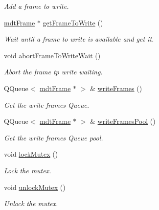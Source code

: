 \begin{DoxyCompactItemize}
\begin{DoxyCompactList}\small\item\em Add a frame to write. \end{DoxyCompactList}\item 
\hyperlink{classmdt_frame}{mdt\-Frame} $\ast$ \hyperlink{classmdt_abstract_port_a6c5ebd4451aec959efc4e71ab1b13941}{get\-Frame\-To\-Write} ()
\begin{DoxyCompactList}\small\item\em Wait until a frame to write is available and get it. \end{DoxyCompactList}\item 
void \hyperlink{classmdt_abstract_port_ae67c815f68317c70e398eaa86622af6b}{abort\-Frame\-To\-Write\-Wait} ()
\begin{DoxyCompactList}\small\item\em Abort the frame tp write waiting. \end{DoxyCompactList}\item 
Q\-Queue$<$ \hyperlink{classmdt_frame}{mdt\-Frame} $\ast$ $>$ \& \hyperlink{classmdt_abstract_port_a4fed10be147dfce6ca315467ff3fb968}{write\-Frames} ()
\begin{DoxyCompactList}\small\item\em Get the write frames Queue. \end{DoxyCompactList}\item 
Q\-Queue$<$ \hyperlink{classmdt_frame}{mdt\-Frame} $\ast$ $>$ \& \hyperlink{classmdt_abstract_port_abf093b67fddebffa4f3c52277b9a8cf7}{write\-Frames\-Pool} ()
\begin{DoxyCompactList}\small\item\em Get the write frames Queue pool. \end{DoxyCompactList}\item 
void \hyperlink{classmdt_abstract_port_a6bf2ecdcf894da3929a22eb8793a9fe3}{lock\-Mutex} ()
\begin{DoxyCompactList}\small\item\em Lock the mutex. \end{DoxyCompactList}\item 
void \hyperlink{classmdt_abstract_port_a3523c72a06e4d950338f91e56c286e84}{unlock\-Mutex} ()
\begin{DoxyCompactList}\small\item\em Unlock the mutex. \end{DoxyCompactList}\end{DoxyCompactItemize}
